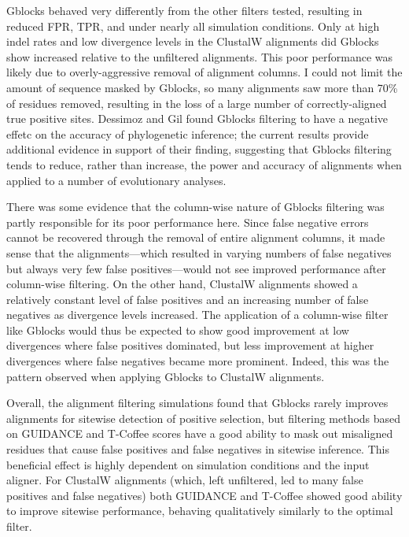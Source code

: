 Gblocks behaved very differently from the other filters tested,
resulting in reduced FPR, TPR, and \tpr under nearly all simulation
conditions. Only at high indel rates and low divergence levels in the
ClustalW alignments did Gblocks show increased \tpr relative to the
unfiltered alignments. This poor performance was likely due to
overly-aggressive removal of alignment columns. I could not limit the
amount of sequence masked by Gblocks, so many alignments saw more than
70\% of residues removed, resulting in the loss of a large number of
correctly-aligned true positive sites. Dessimoz and Gil
\citeyearpar{Dessimoz2010Phylogenetic} found Gblocks filtering to have
a negative effetc on the accuracy of phylogenetic inference; the
current results provide additional evidence in support of their
finding, suggesting that Gblocks filtering tends to reduce, rather
than increase, the power and accuracy of alignments when applied to a
number of evolutionary analyses.

There was some evidence that the column-wise nature of Gblocks
filtering was partly responsible for its poor performance here. Since
false negative errors cannot be recovered through the removal of
entire alignment columns, it made sense that the \prankc
alignments---which resulted in varying numbers of false negatives but
always very few false positives---would not see improved performance
after column-wise filtering. On the other hand, ClustalW alignments
showed a relatively constant level of false positives and an
increasing number of false negatives as divergence levels
increased. The application of a column-wise filter like Gblocks would
thus be expected to show good improvement at low divergences where
false positives dominated, but less improvement at higher divergences
where false negatives became more prominent. Indeed, this was the
pattern observed when applying Gblocks to ClustalW alignments.

Overall, the alignment filtering simulations found that Gblocks rarely
improves alignments for sitewise detection of positive selection, but
filtering methods based on GUIDANCE and T-Coffee scores have a good
ability to mask out misaligned residues that cause false positives and
false negatives in sitewise inference. This beneficial effect is
highly dependent on simulation conditions and the input aligner. For
ClustalW alignments (which, left unfiltered, led to many false
positives and false negatives) both GUIDANCE and T-Coffee showed good
ability to improve sitewise performance, behaving qualitatively
similarly to the optimal filter.

